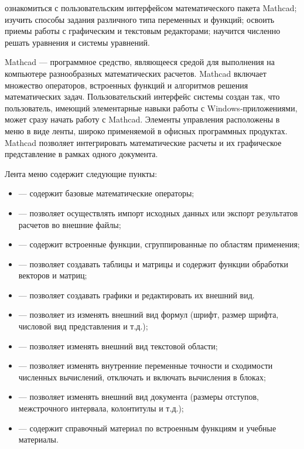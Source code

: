 
\goal ознакомиться с пользовательским интерфейсом математического пакета Mathcad; изучить способы задания различного типа переменных и функций; освоить приемы работы с графическим и текстовым редакторами; научится численно решать уравнения и системы уравнений.

Mathcad --- программное средство, являющееся средой для выполнения на компьютере разнообразных математических расчетов. Mathcad включает множество операторов, встроенных функций и алгоритмов решения  математических задач. Пользовательский интерфейс системы создан так, что пользователь, имеющий элементарные навыки работы с Windows-приложениями, может сразу начать работу с Mathcad. Элементы управления расположены в меню в виде ленты, широко применяемой в офисных программных продуктах. Mathcad позволяет интегрировать математические расчеты и их графическое представление в рамках одного документа.

Лента меню содержит следующие пункты:
\begin{itemize}
	\item {} --- содержит базовые математические операторы;
	\item {} --- позволяет осуществлять импорт исходных данных или экспорт результатов расчетов во внешние файлы;
	\item {} --- содержит встроенные функции, сгруппированные по областям применения;
	\item {} --- позволяет создавать таблицы и матрицы и содержит функции обработки векторов и матриц;
	\item  {} --- позволяет создавать графики и редактировать их внешний вид.
	\item {} --- позволяет из изменять внешний вид формул (шрифт, размер шрифта, числовой вид представления и т.д.);
	\item {} --- позволяет изменять внешний вид текстовой области;
	\item {} --- позволяет изменять внутренние переменные точности и сходимости численных вычислений, отключать и включать вычисления в блоках;
	\item {} --- позволяет изменять внешний вид документа (размеры отступов, межстрочного интервала, колонтитулы и т.д.);
	\item {} --- содержит справочный материал по встроенным функциям и учебные материалы.
\end{itemize} 

